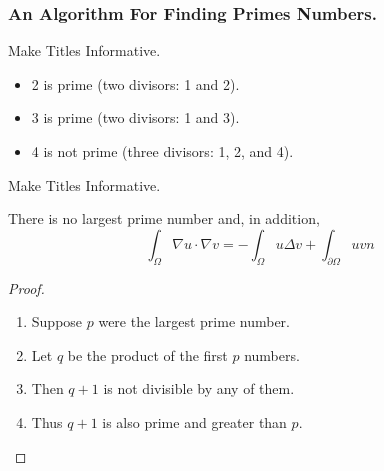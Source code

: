 \documentclass[ucs,9pt]{beamer}
\begin{document}
\begin{frame}[fragile]
  \frametitle{An Algorithm For Finding Primes Numbers.}
\begin{semiverbatim}
\end{semiverbatim}
\end{frame}



\begin{frame}{Make Titles Informative.}
  \begin{example}
    \begin{itemize}
    \item 2 is prime (two divisors: 1 and 2).
    \item 3 is prime (two divisors: 1 and 3).
    \item 4 is not prime (\alert{three} divisors: 1, 2, and 4).
    \end{itemize}
  \end{example}
\end{frame}

\begin{frame}{Make Titles Informative.}
\begin{theorem}
 There is no largest prime number and, in addition, $$\int_\Omega \nabla u \cdot \nabla v = - \int_\Omega u \Delta v + \int_{\partial\Omega} u v n$$
 \end{theorem}
 \begin{proof}
 \begin{enumerate}
 \item<1-> Suppose $p$ were the largest prime number.
 \item<2-> Let $q$ be the product of the first $p$ numbers.
 \item<3-> Then $q + 1$ is not divisible by any of them.
 \item<1-> Thus $q + 1$ is also prime and greater than $p$.\qedhere
 \end{enumerate} 
 \end{proof}
\end{frame}
\end{document}
